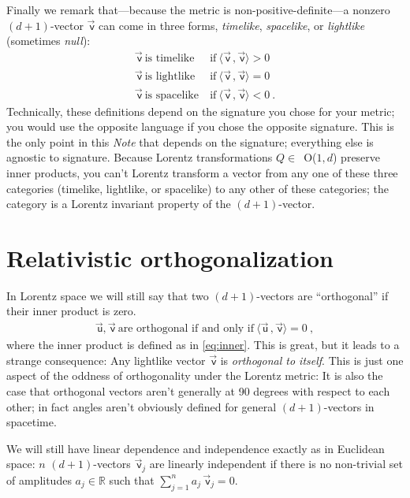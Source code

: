 \documentclass{article}
\newcommand\upvec[1]{\!\vec{\,\mathrm{#1}}}
\newcommand{\Lvec}[1]{\upvec{\mathsf{#1}}} %
\newcommand{\inner}[2]{\langle{#1}\,,{#2}\rangle}
\newcommand{\plus}{\!+\!} %
\newcommand{\documentname}{\textsl{Note}}
\begin{document}
Finally we remark that---because the metric is non-positive-definite---a nonzero $(d\plus1)$-vector $\Lvec{v}$ can come in three forms, \emph{timelike}, \emph{spacelike}, or \emph{lightlike} (sometimes \emph{null}):
\begin{align}
    \Lvec{v} ~ \mbox{is timelike}  &~ \mbox{if} ~ \inner{\Lvec{v}}{\Lvec{v}} > 0 \label{eq:timelike}\\
    \Lvec{v} ~ \mbox{is lightlike} &~ \mbox{if} ~ \inner{\Lvec{v}}{\Lvec{v}} = 0 \label{eq:lightlike}\\
    \Lvec{v} ~ \mbox{is spacelike} &~ \mbox{if} ~ \inner{\Lvec{v}}{\Lvec{v}} < 0 ~.\label{eq:spacelike}
\end{align}
Technically, these definitions depend on the signature you chose for your metric; you would use the opposite language if you chose the opposite signature.
This is the only point in this \documentname{} that depends on the signature; everything else is agnostic to signature.
Because Lorentz transformations $Q\in$~O($1,d$) preserve inner products, you can't Lorentz transform a vector from any one of these three categories (timelike, lightlike, or spacelike) to any other of these categories; the category is a Lorentz invariant property of the $(d\plus1)$-vector.

\section{Relativistic orthogonalization}\label{sec:orth}

In Lorentz space we will still say that two $(d\plus1)$-vectors are ``orthogonal'' if their inner product is zero.
\begin{align}
    \Lvec{u},\Lvec{v} ~ \mbox{are orthogonal if and only if} ~ \inner{\Lvec{u}}{\Lvec{v}}=0 ~,
\end{align}
where the inner product is defined as in \eqref{eq:inner}.
This is great, but it leads to a strange consequence:
Any lightlike vector $\Lvec{v}$ is \emph{orthogonal to itself}.
This is just one aspect of the oddness of orthogonality under the Lorentz metric:
It is also the case that orthogonal vectors aren't generally at 90 degrees with respect to each other; in fact angles aren't obviously defined for general $(d\plus1)$-vectors in spacetime.

We will still have linear dependence and independence exactly as in Euclidean space:
$n$ $(d\plus1)$-vectors $\Lvec{v}_j$ are linearly independent if there is no non-trivial set of amplitudes $a_j\in\mathbb{R}$ such that $\sum_{j=1}^n a_j\,\Lvec{v}_j = 0$.
\end{document}
